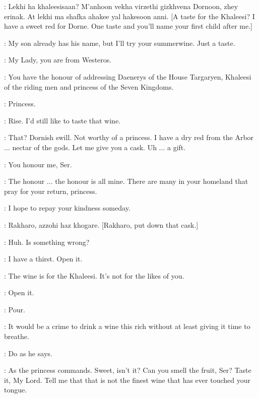 \WINESELLER: Lekhi ha khaleesisaan? M'anhoon vekha virzethi gizkhvena Dornoon, zhey erinak. At lekhi ma shafka ahakee yal hakesoon anni. [A taste for the Khaleesi? I have a sweet red for Dorne. One taste and you'll name your first child after me.] 

\DAENERYS: My son already has his name, but I'll try your summerwine. Just a taste. 

\WINESELLER: My Lady, you are from Westeros. 

\IRRI: You have the honour of addressing Daenerys of the House Targaryen, Khaleesi of the riding men and princess of the Seven Kingdoms. 

\WINESELLER:  Princess. 

\DAENERYS: Rise. I'd still like to taste that wine. 

\WINESELLER: That? Dornish swill. Not worthy of a princess. I have a dry red from the Arbor $\ldots$ nectar of the gods. Let me give you a cask. Uh $\ldots$ a gift. 

\DAENERYS: You honour me, Ser. 

\WINESELLER: The honour $\ldots$ the honour is all mine. There are many in your homeland that pray for your return, princess. 


\DAENERYS: I hope to repay your kindness someday. 


\JORAH: Rakharo, azzohi haz khogare. [Rakharo, put down that cask.] 

\DAENERYS: Huh. Is something wrong? 

\JORAH: I have a thirst. Open it. 

\WINESELLER: The wine is for the Khaleesi. It's not for the likes of you. 

\JORAH: Open it. 


\JORAH: Pour. 

\WINESELLER: It would be a crime to drink a wine this rich without at least giving it time to breathe. 

\DAENERYS: Do as he says. 

\WINESELLER: As the princess commands.  Sweet, isn't it? Can you smell the fruit, Ser? Taste it, My Lord. Tell me that that is not the finest wine that has ever touched your tongue. 

